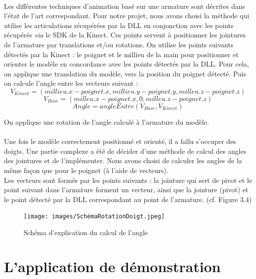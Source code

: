 \paragraph{}
Les différentes techniques d'animation basé sur une armature sont décrites dans l'état de l'art correspondant. 
Pour notre projet, nous avons choisi la méthode qui utilise les articulations récupérées par la DLL en conjonction avec les points récupérés \textit{via} le SDK de la Kinect. 
Ces points servent à positionner les jointures de l'armature par translations et/ou rotations.\newline
On utilise les points suivants détectés par la Kinect : le poignet et le millieu de la main pour positionner et orienter le modèle en concordance avec les points détectés par la DLL.
Pour cela, on applique une translation du modèle, vers la position du poignet détecté. Puis on calcule l'angle entre les vecteurs suivant : 
$$
V_{Kinect} = (millieu.x - poignet.x, millieu.y - poignet.y, milleu.z - poignet.z)
$$
$$
V_{Base}   = (milleu.x - poignet.x, 0, milleu.z - poignet.z)
$$
$$
Angle = angleEntre(V_{Base}, V_{Kinect})
$$

On applique une rotation de l'angle calculé à l'armature du modèle.

\paragraph{}

Une fois le modèle correctement positionné et orienté, il a fallu s'occuper des doigts. Une partie complexe a été de décider d'une méthode de calcul des angles des jointures et de l'implémenter.
Nous avons choisi de calculer les angles de la même façon que pour le poignet (à l'aide de vecteurs).\\
Les vecteurs sont formés par les points suivants : la jointure qui sert de pivot et le point suivant dans l'armature forment un vecteur, ainsi que la jointure (pivot) et le point détecté par la DLL correspondant au point de l'armature. (cf. Figure 3.4)

\begin{figure}[!h]
 \centering
 \texttt{[image: images/SchémaRotationDoigt.jpeg]}
 \caption{Schéma d'explication du calcul de l'angle}
\end{figure}

\section{L'application de démonstration}